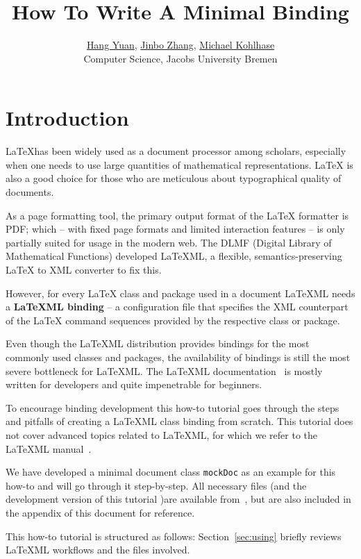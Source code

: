 \documentclass[a4paper]{article}
\title{\textbf{How To Write A Minimal \latexml Binding}}
\author{\href{mailto:h.yuan@jacobs-university.de}{Hang Yuan}, 
	\href{mailto:jin.zhang@jacobs-university.de}{Jinbo Zhang},
        \href{mailto:m.kohlhase@jacobs-university.de}{Michael Kohlhase}\\
        Computer Science, Jacobs University Bremen}
\def\latexml{{\LaTeX}ML\xspace}
\begin{document}
\maketitle

\section{Introduction}\label{sec:intro}

{\LaTeX}has been widely used as a document processor among scholars, especially when one
needs to use large quantities of mathematical representations. {\LaTeX} is also a good
choice for those who are meticulous about typographical quality of documents.

As a page formatting tool, the primary output format of the {\LaTeX} formatter is PDF;
which -- with fixed page formats and limited interaction features -- is only partially
suited for usage in the modern web. The DLMF (Digital Library of Mathematical Functions)
developed \latexml, a flexible, semantics-preserving {\LaTeX} to XML converter to fix
this.

However, for every {\LaTeX} class and package used in a document \latexml needs a
\textbf{\latexml binding} -- a configuration file that specifies the XML counterpart of
the {\LaTeX} command sequences provided by the respective class or package. 

Even though the \latexml distribution provides bindings for the most commonly used classes
and packages, the availability of bindings is still the most severe bottleneck for
\latexml. The \latexml documentation~\cite{LaTeXML:manual} is mostly written for developers and
quite impenetrable for beginners.

To encourage binding development this how-to tutorial goes through the steps and pitfalls
of creating a \latexml class binding from scratch. This tutorial does not cover advanced
topics related to \latexml, for which we refer to the \latexml manual~\cite{LaTeXML:manual}.

We have developed a minimal document class \lstinline|mockDoc| as an example for this
how-to and will go through it step-by-step. All necessary files (and the development
version of this tutorial )are available from~\cite{mockDoc:git}, but are also included in
the appendix of this document for reference.

This how-to tutorial is structured as follows: Section~\ref{sec:using} briefly reviews
\latexml workflows and the files involved.
\end{document}
